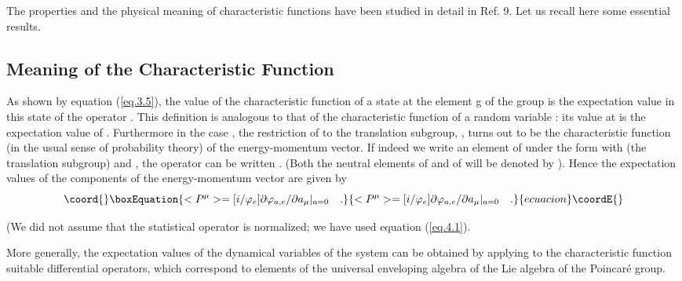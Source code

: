 \documentclass[a4paper,11pt]{article}
\def\Uc#1{U_{\chi,{#1}}}
\begin{document}
The properties and the physical meaning of characteristic functions have been studied in detail 
in Ref. 9. Let us recall here some essential results.

\subsection{Meaning of the Characteristic Function}

 As shown by equation (\ref{eq.3.5}), the value of the characteristic function \myHighlight{$\varphi$}\coordHE{} of a 
state at 
the element g of the group is the expectation value in this state of the operator 
\myHighlight{$\Uc{g^{-1}}$}\coordHE{}. This 
definition is analogous to that of the characteristic function of a random variable \coordHE{}: its 
value at \coordHE{} is the expectation value of \coordHE{}. Furthermore in the case \coordHE{}, the 
restriction of \myHighlight{$\varphi$}\coordHE{} 
to the translation subgroup, \coordHE{}, turns out to be the characteristic 
function (in the 
usual sense of probability theory) of the energy-momentum vector. If indeed we write an element 
of \coordHE{} under the form \coordHE{} with \coordHE{} (the translation subgroup) and \coordHE{}, 
the operator 
\coordHE{} can be written \coordHE{}. (Both the neutral elements of \coordHE{} and of 
\coordHE{} will be 
denoted by \coordHE{}). Hence the expectation values of the components of the energy-momentum vector 
are given by  
\begin{equation}\coord{}\boxEquation{
 \label{eq.5.1}
    < P^{\mu} > = [i/\phi_e] \partial \phi_{a,e}/\partial a_{\mu} |_{a=0}  \quad .
}{
 < P^{\mu} > = [i/\phi_e] \partial \phi_{a,e}/\partial a_{\mu} |_{a=0}  \quad .
}{ecuacion}\coordE{}\end{equation}

(We did not assume that the statistical operator is normalized; we have used equation 
(\ref{eq.4.1}). 

More generally, the expectation values of the dynamical variables of the system can be obtained 
by applying to the characteristic function suitable differential operators, which correspond to 
elements of the universal enveloping algebra of the Lie algebra of the Poincar\'e  group. 
\end{document}
